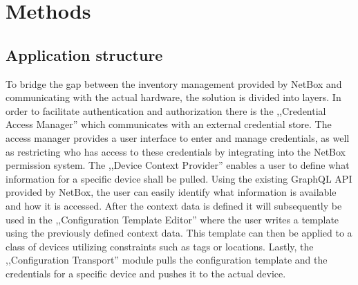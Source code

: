 \chapter{\label{methods}Methods}
\thispagestyle{fancy}


\section{Application structure}

To bridge the gap between the inventory management provided by NetBox and communicating with the actual hardware,
the solution is divided into layers.
In order to facilitate authentication and authorization there is the ,,Credential Access Manager'' which communicates
with an external credential store. The access manager provides a user interface to enter and manage credentials, as well
as restricting who has access to these credentials by integrating into the NetBox permission system.
The ,,Device Context Provider'' enables a user to define what information for a specific device shall be pulled.
Using the existing GraphQL API provided by NetBox, the user can easily identify what information is available and how it is
accessed. After the context data is defined it will subsequently be used in the ,,Configuration Template Editor''
where the user writes a template using the previously defined context data. This template can then be applied to
a class of devices utilizing constraints such as tags or locations.
Lastly, the ,,Configuration Transport'' module pulls the configuration template and the credentials for a specific device
and pushes it to the actual device.

